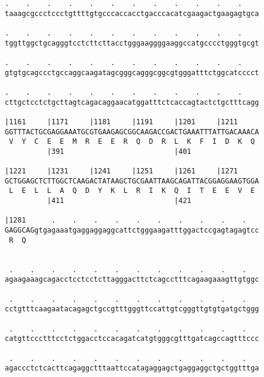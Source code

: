\documentclass{article}
\begin{document}
\begin{Verbatim}
.    .    .    .    .    .    .    .    .    .    .    .    
taaagcgccctccctgttttgtgcccaccacctgacccacatcgaagactgaagagtgca
                                                            
.    .    .    .    .    .    .    .    .    .    .    .    
tggttggctgcagggtcctcttcttacctgggaaggggaaggccatgcccctgggtgcgt
                                                            
.    .    .    .    .    .    .    .    .    .    .    .    
gtgtgcagccctgccaggcaagatagcgggcagggcggcgtgggatttctggcatcccct
                                                            
.    .    .    .    .    .    .    .    .    .    .    .    
cttgctcctctgcttagtcagacaggaacatggatttctcaccagtactctgctttcagg
                                                            
|1161     |1171     |1181     |1191     |1201     |1211     
GGTTTACTGCGAGGAAATGCGTGAAGAGCGGCAAGACCGACTGAAATTTATTGACAAACA
 V  Y  C  E  E  M  R  E  E  R  Q  D  R  L  K  F  I  D  K  Q 
          |391                          |401                
  
|1221     |1231     |1241     |1251     |1261     |1271     
GCTGGAGCTCTTGGCTCAAGACTATAAGCTGCGAATTAAGCAGATTACGGAGGAAGTGGA
 L  E  L  L  A  Q  D  Y  K  L  R  I  K  Q  I  T  E  E  V  E 
          |411                          |421                
  
|1281      .    .    .    .    .    .    .    .    .    .   
GAGGCAGgtgagaaatgaggaggaggcattctgggaagatttggactccgagtagagtcc
 R  Q                                                       
                                                            
  
 .    .    .    .    .    .    .    .    .    .    .    .   
agaagaaagcagacctcctcctcttagggacttctcagcctttcagaagaaagttgtggc
                                                            
 .    .    .    .    .    .    .    .    .    .    .    .   
cctgtttcaagaatacagagctgccgtttgggttccattgtcgggttgtgtgatgctggg
                                                            
 .    .    .    .    .    .    .    .    .    .    .    .   
catgttccctttcctctggacctccacagatcatgtgggcgtttgatcagccagtttccc
                                                            
 .    .    .    .    .    .    .    .    .    .    .    .   
agaccctctcacttcagaggctttaattccatagaggagctgaggaggctgctggtttga
                                                            

\end{Verbatim}
\end{document}
